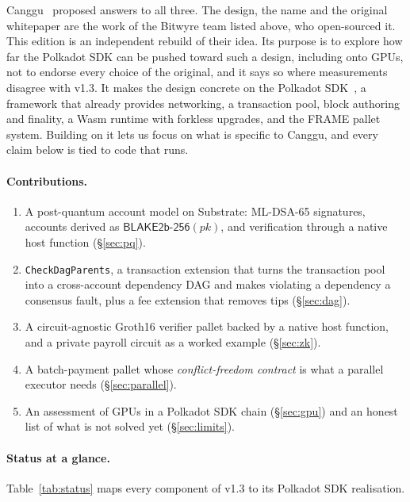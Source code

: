 \documentclass[11pt]{article}
\theoremstyle{definition}
\theoremstyle{remark}
\begin{document}
Canggu~\cite{canggu-v13} proposed answers to all three. The design, the name and the original
whitepaper are the work of the Bitwyre team listed above, who open-sourced it. This edition is an
independent rebuild of their idea. Its purpose is to explore how far the Polkadot SDK can be pushed
toward such a design, including onto GPUs, not to endorse every choice of the original, and it
says so where measurements disagree with v1.3. It makes the design concrete on
the Polkadot SDK~\cite{polkadotsdk}, a framework that already provides networking, a transaction
pool, block authoring and finality, a Wasm runtime with forkless upgrades, and the FRAME pallet
system. Building on it lets us focus on what is specific to Canggu, and every claim below is tied
to code that runs.

\paragraph{Contributions.}
\begin{enumerate}[leftmargin=*, itemsep=2pt]
  \item A post-quantum account model on Substrate: ML-DSA-65 signatures, accounts derived as
        $\mathsf{BLAKE2b\text{-}256}(pk)$, and verification through a native host function
        (\S\ref{sec:pq}).
  \item \texttt{CheckDagParents}, a transaction extension that turns the transaction pool into a
        cross-account dependency DAG and makes violating a dependency a consensus fault, plus a fee
        extension that removes tips (\S\ref{sec:dag}).
  \item A circuit-agnostic Groth16 verifier pallet backed by a native host function, and a private
        payroll circuit as a worked example (\S\ref{sec:zk}).
  \item A batch-payment pallet whose \emph{conflict-freedom contract} is what a parallel executor
        needs (\S\ref{sec:parallel}).
  \item An assessment of GPUs in a Polkadot SDK chain (\S\ref{sec:gpu}) and an honest list of
        what is not solved yet (\S\ref{sec:limits}).
\end{enumerate}

\paragraph{Status at a glance.} Table~\ref{tab:status} maps every component of v1.3 to its
Polkadot SDK realisation.
\end{document}
